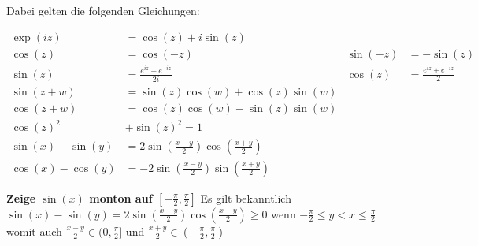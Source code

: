 \documentclass[25pt]{sciposter}
\begin{document}
\begin{multicols}{3}
\begin{figure}[!ht]
\end{figure}

Dabei gelten die folgenden Gleichungen:

\begin{align*}
	\operatorname{exp}(iz) &= \cos (z) + i\sin(z)\\
	\cos(z) &= \cos(-z) & \sin (-z) &= - \sin(z) \\
	\sin (z) &= \frac{e^{iz} - e^{-iz}}{2i} & \cos (z) &= \frac{e^{iz} + e^{-iz}}{2}\\
	\sin(z+w) &= \sin(z) \cos(w) + \cos(z) \sin(w) \\
	\cos(z + w) &= \cos(z) \cos(w) - \sin(z) \sin(w)\\
	\cos(z) ^2 &+ \sin(z)^2 = 1\\
	\sin(x) - \sin(y) &=  2 \sin \left(\frac{x-y}{2}\right) \cos \left(\frac{x+y}{2}\right)\\
	\cos(x) - \cos(y) &= - 2 \sin \left(\frac{x-y}{2}\right) \sin \left(\frac{x+y}{2}\right)
\end{align*}

\textbf{Zeige $\sin(x)$ monton auf $[-\frac{\pi}{2}, \frac{\pi}{2}]$} Es gilt bekanntlich $\sin(x) - \sin(y) =  2 \sin \left(\frac{x-y}{2}\right) \cos \left(\frac{x+y}{2}\right) \geq 0$ wenn $-\frac{\pi}{2} \leq y < x \leq \frac{\pi}{2}$ womit auch $\frac{x-y}{2} \in (0,\frac{\pi}{2}]$ und $\frac{x+y}{2} \in (- \frac{\pi}{2}, \frac{\pi}{2})$


\end{multicols}
\end{document}
